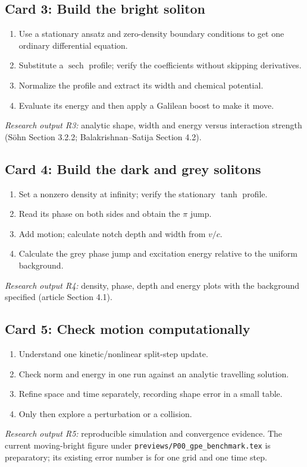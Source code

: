 \subsection{Card 3: Build the bright soliton}
\begin{enumerate}[label=3.\arabic*.,leftmargin=2.5em]
\item Use a stationary ansatz and zero-density boundary conditions to get one ordinary differential equation.
\item Substitute a $\operatorname{sech}$ profile; verify the coefficients without skipping derivatives.
\item Normalize the profile and extract its width and chemical potential.
\item Evaluate its energy and then apply a Galilean boost to make it move.
\end{enumerate}
\noindent\emph{Research output R3:} analytic shape, width and energy versus interaction strength (S\"ohn Section 3.2.2; Balakrishnan--Satija Section 4.2).

\subsection{Card 4: Build the dark and grey solitons}
\begin{enumerate}[label=4.\arabic*.,leftmargin=2.5em]
\item Set a nonzero density at infinity; verify the stationary $\tanh$ profile.
\item Read its phase on both sides and obtain the $\pi$ jump.
\item Add motion; calculate notch depth and width from $v/c$.
\item Calculate the grey phase jump and excitation energy relative to the uniform background.
\end{enumerate}
\noindent\emph{Research output R4:} density, phase, depth and energy plots with the background specified (article Section 4.1).

\subsection{Card 5: Check motion computationally}
\begin{enumerate}[label=5.\arabic*.,leftmargin=2.5em]
\item Understand one kinetic/nonlinear split-step update.
\item Check norm and energy in one run against an analytic travelling solution.
\item Refine space and time separately, recording shape error in a small table.
\item Only then explore a perturbation or a collision.
\end{enumerate}
\noindent\emph{Research output R5:} reproducible simulation and convergence evidence. The current moving-bright figure under \texttt{previews/P00\_gpe\_benchmark.tex} is preparatory; its existing error number is for one grid and one time step.

